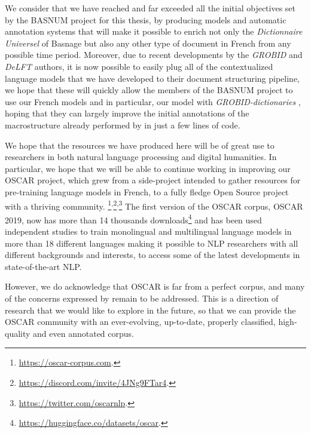 We consider that we have reached and far exceeded all the initial objectives set by the BASNUM project for this thesis, by producing models and automatic annotation systems that will make it possible to enrich not only the \emph{Dictionnaire Universel} of Basnage but also any other type of document in French from any possible time period. Moreover, due to recent developments by the \emph{GROBID} \citep{lopez-etal-2018-grobid} and \emph{DeLFT} \citep{lopez-etal-2018-delft} authors, it is now possible to easily plug all of the contextualized language models that we have developed to their document structuring pipeline, we hope that these will quickly allow the members of the BASNUM project to use our French models and in particular, our \dalembert model with \emph{GROBID-dictionaries} \citep{khemakhem-etal-2017-automatic,khemakhem-etal-2018-enhancing}, hoping that they can largely improve the initial annotations of the macrostructure already performed by \citet{khemakhem-2020-standard} in just a few lines of code.

We hope that the resources we have produced here will be of great use to researchers in both natural language processing and digital humanities. In particular, we hope that we will be able to continue working in improving our OSCAR project, which grew from a side-project intended to gather resources for pre-training language models in French, to a fully fledge Open Source project with a thriving community. \footnote{\url{https://oscar-corpus.com}.}\textsuperscript{,}\footnote{\url{https://discord.com/invite/4JNg9FTar4}.}\textsuperscript{,}\footnote{\url{https://twitter.com/oscarnlp}.} The first version of the OSCAR corpus, OSCAR 2019, now has more than 14 thousands downloads\footnote{\url{https://huggingface.co/datasets/oscar}.} and has been used independent studies to train monolingual and multilingual language models in more than 18 different languages \citep{antoun-etal-2021-araelectra, kakwani-etal-2020-indicnlpsuite, wilie-etal-2020-indonlu, chan-etal-2020-germans, koutsikakis-etal-2020-greek, martin-etal-2020-camembert, chriqui-etal-2021-hebert, seker-etal-2021-alephbert, delobelle-etal-2020-robbert, dumitrescu-etal-2020-birth, masala-etal-2020-robert} making it possible to NLP researchers with all different backgrounds and interests, to access some of the latest developments in state-of-the-art NLP.

However, we do acknowledge that OSCAR is far from a perfect corpus, and many of the concerns expressed by \citet{caswell-etal-2020-language,kreutzer-etal-2021-quality} remain to be addressed. This is a direction of research that we would like to explore in the future, so that we can provide the OSCAR community with an ever-evolving, up-to-date, properly classified, high-quality and even annotated corpus.

